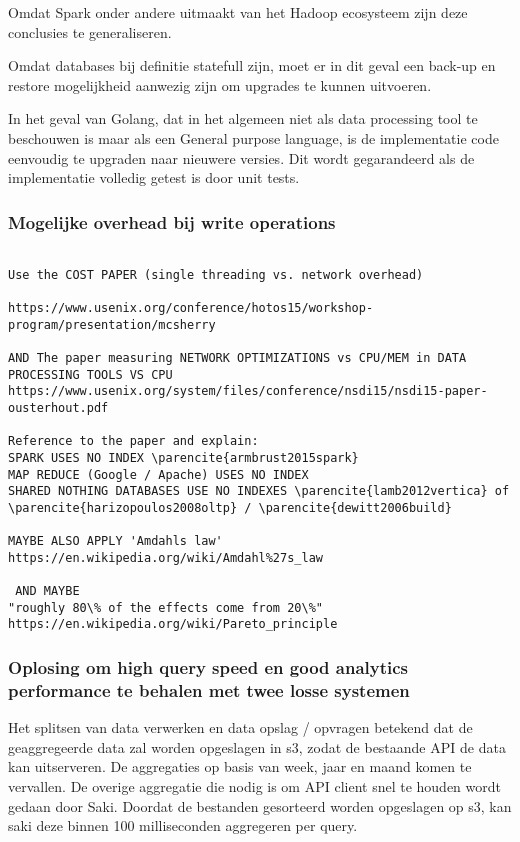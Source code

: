 Omdat Spark onder andere uitmaakt van het Hadoop ecosysteem zijn deze conclusies te generaliseren.

Omdat databases bij definitie statefull zijn, moet er in dit geval een back-up en restore mogelijkheid aanwezig zijn om upgrades te kunnen uitvoeren.

In het geval van Golang, dat in het algemeen niet als data processing tool te beschouwen is maar als een General purpose language, is de implementatie code eenvoudig te upgraden naar nieuwere versies. Dit wordt gegarandeerd als de implementatie volledig getest is door unit tests. 

\subsubsection{\textbf{Mogelijke overhead bij write operations}}


\begin{verbatim}

Use the COST PAPER (single threading vs. network overhead)

https://www.usenix.org/conference/hotos15/workshop-program/presentation/mcsherry

AND The paper measuring NETWORK OPTIMIZATIONS vs CPU/MEM in DATA PROCESSING TOOLS VS CPU
https://www.usenix.org/system/files/conference/nsdi15/nsdi15-paper-ousterhout.pdf

Reference to the paper and explain:
SPARK USES NO INDEX \parencite{armbrust2015spark}
MAP REDUCE (Google / Apache) USES NO INDEX 
SHARED NOTHING DATABASES USE NO INDEXES \parencite{lamb2012vertica} of \parencite{harizopoulos2008oltp} / \parencite{dewitt2006build}

MAYBE ALSO APPLY 'Amdahls law'
https://en.wikipedia.org/wiki/Amdahl%27s_law

 AND MAYBE 
"roughly 80\% of the effects come from 20\%"
https://en.wikipedia.org/wiki/Pareto_principle

\end{verbatim}


\subsubsection{\textbf{Oplosing om  high query speed en good analytics performance te behalen met  twee losse systemen}}

Het splitsen van data verwerken en data opslag / opvragen betekend dat de geaggregeerde data zal worden opgeslagen in s3, zodat de bestaande API de data kan uitserveren. 
De aggregaties op basis van week, jaar en maand komen te vervallen. De overige aggregatie die nodig is om API client snel te houden wordt gedaan door Saki. Doordat de bestanden gesorteerd worden opgeslagen op s3, kan saki deze binnen 100 milliseconden aggregeren per query.

